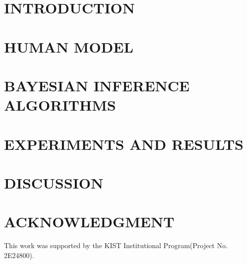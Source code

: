 \documentclass[letterpaper, 10 pt, conference]{ieeeconf}  %
\theoremstyle{plain} \theorembodyfont{\upshape}
\begin{document}
\section{INTRODUCTION}


\section{HUMAN MODEL}


\section{BAYESIAN INFERENCE ALGORITHMS}


\section{EXPERIMENTS AND RESULTS}


\section{DISCUSSION}
%



\addtolength{\textheight}{-12cm}   %






\section*{ACKNOWLEDGMENT}
This work was supported by the KIST Institutional Program(Project No. 2E24800).






\end{document}
